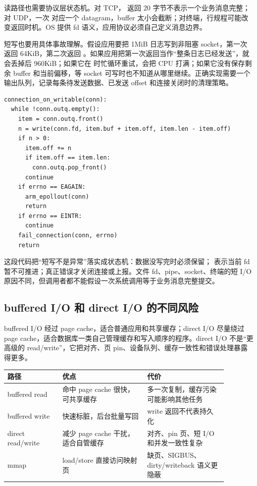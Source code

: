 读路径也需要协议层状态机。对 TCP， 返回 20 字节不表示一个业务消息完整；对 UDP，一次  对应一个 datagram，buffer 太小会截断；对终端，行规程可能改变返回时机。OS 提供 fd 语义，应用协议必须自己定义消息边界。

短写也要用具体事故理解。假设应用要把 1MiB 日志写到非阻塞 socket，第一次  返回 64KiB，第二次返回 。如果应用把第一次返回当作“整条日志已经发送”，就会丢掉后 960KiB；如果它在  时忙循环重试，会把 CPU 打满；如果它没有保存剩余 buffer 和当前偏移，等 socket 可写时也不知道从哪里继续。正确实现需要一个输出队列，记录每条待发送数据、已发送 offset 和连接关闭时的清理策略。

\begin{lstlisting}
connection_on_writable(conn):
  while !conn.outq.empty():
    item = conn.outq.front()
    n = write(conn.fd, item.buf + item.off, item.len - item.off)
    if n > 0:
      item.off += n
      if item.off == item.len:
        conn.outq.pop_front()
      continue
    if errno == EAGAIN:
      arm_epollout(conn)
      return
    if errno == EINTR:
      continue
    fail_connection(conn, errno)
    return
\end{lstlisting}

这段代码把“短写不是异常”落实成状态机：数据没写完时必须保留； 表示当前 fd 暂不可推进；真正错误才关闭连接或上报。文件 fd、pipe、socket、终端的短 I/O 原因不同，但调用者都不能假设一次系统调用等于业务消息完整提交。

\subsection{buffered I/O 和 direct I/O 的不同风险}

buffered I/O 经过 page cache，适合普通应用和共享缓存；direct I/O 尽量绕过 page cache，适合数据库一类自己管理缓存和写入顺序的程序。direct I/O 不是“更高级的 read/write”，它把对齐、页 pin、设备队列、缓存一致性和错误处理暴露得更多。

\begin{longtable}{|p{0.22\linewidth}|p{0.34\linewidth}|p{0.32\linewidth}|}
\toprule
路径 & 优点 & 代价 \\
\midrule
buffered read & 命中 page cache 很快，可共享缓存 & 多一次复制，缓存污染可能影响其他任务 \\\tablerowrule
buffered write & 快速标脏，后台批量写回 & write 返回不代表持久化 \\\tablerowrule
direct read/write & 减少 page cache 干扰，适合自管缓存 & 对齐、pin 页、短 I/O 和并发一致性复杂 \\\tablerowrule
mmap & load/store 直接访问映射页 & 缺页、SIGBUS、dirty/writeback 语义更隐蔽 \\
\bottomrule
\end{longtable}

